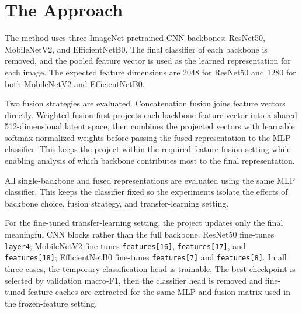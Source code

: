 \section{The Approach}

The method uses three ImageNet-pretrained CNN backbones: ResNet50, MobileNetV2, and EfficientNetB0. The final classifier of each backbone is removed, and the pooled feature vector is used as the learned representation for each image. The expected feature dimensions are 2048 for ResNet50 and 1280 for both MobileNetV2 and EfficientNetB0.

Two fusion strategies are evaluated. Concatenation fusion joins feature vectors directly. Weighted fusion first projects each backbone feature vector into a shared 512-dimensional latent space, then combines the projected vectors with learnable softmax-normalized weights before passing the fused representation to the MLP classifier. This keeps the project within the required feature-fusion setting while enabling analysis of which backbone contributes most to the final representation.

All single-backbone and fused representations are evaluated using the same MLP classifier. This keeps the classifier fixed so the experiments isolate the effects of backbone choice, fusion strategy, and transfer-learning setting.

For the fine-tuned transfer-learning setting, the project updates only the final meaningful CNN
blocks rather than the full backbone. ResNet50 fine-tunes \texttt{layer4}; MobileNetV2 fine-tunes
\texttt{features[16]}, \texttt{features[17]}, and \texttt{features[18]}; EfficientNetB0 fine-tunes
\texttt{features[7]} and \texttt{features[8]}. In all three cases, the temporary classification head
is trainable. The best checkpoint is selected by validation macro-F1, then the classifier head is
removed and fine-tuned feature caches are extracted for the same MLP and fusion matrix used in the
frozen-feature setting.
